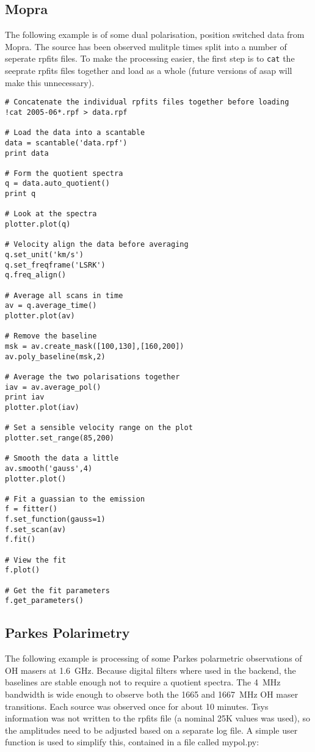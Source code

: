 \documentclass[11pt]{article}
\newcommand{\cmd}[1]{{\tt #1}}
\begin{document}
\subsection{Mopra}

The following example is of some dual polarisation, position switched
data from Mopra. The source has been observed mulitple times split
into a number of seperate rpfits files. To make the processing easier,
the first step is to \cmd{cat} the seeprate rpfits files together and
load as a whole (future versions of asap will make this unnecessary).


\begin{verbatim}
# Concatenate the individual rpfits files together before loading
!cat 2005-06*.rpf > data.rpf

# Load the data into a scantable
data = scantable('data.rpf')
print data

# Form the quotient spectra
q = data.auto_quotient()
print q

# Look at the spectra
plotter.plot(q)

# Velocity align the data before averaging
q.set_unit('km/s')
q.set_freqframe('LSRK')
q.freq_align()

# Average all scans in time
av = q.average_time()
plotter.plot(av)

# Remove the baseline
msk = av.create_mask([100,130],[160,200])
av.poly_baseline(msk,2)

# Average the two polarisations together
iav = av.average_pol()
print iav
plotter.plot(iav)

# Set a sensible velocity range on the plot
plotter.set_range(85,200)

# Smooth the data a little
av.smooth('gauss',4)
plotter.plot()

# Fit a guassian to the emission
f = fitter()
f.set_function(gauss=1)
f.set_scan(av)
f.fit()

# View the fit
f.plot()

# Get the fit parameters
f.get_parameters()

\end{verbatim}


\subsection{Parkes Polarimetry}

The following example is processing
of some Parkes polarmetric observations of OH masers at
1.6~GHz. Because digital filters where used in the backend, the
baselines are stable enough not to require a quotient spectra. The
4~MHz bandwidth is wide enough to observe both the 1665 and 1667~MHz
OH maser transitions. Each source was observed once for about 10
minutes. Tsys information was not written to the rpfits file (a
nominal 25K values was used), so the amplitudes need to be adjusted
based on a separate log file. A simple user function is used to
simplify this, contained in a file called mypol.py:
\end{document}
